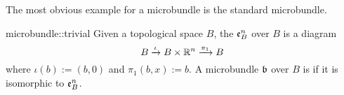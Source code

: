 \begin{myparagraph}
    The most obvious example for a microbundle is the standard microbundle.
\end{myparagraph}

\begin{myexample}{microbundle::trivial}{}
    Given a topological space $B$, the  $\mathfrak{e}^{n}_{B}$ over $B$ is a diagram
    \[ B \xrightarrow{\iota} B \times \mathbb{R}^n \xrightarrow{\pi_1} B{} \]
    where $\iota(b) := (b, 0)$ and $\pi_1(b, x) := b$.
    A microbundle $\mathfrak{b}$ over $B$ is  if it is isomorphic to $\mathfrak{e}^{n}_{B}$.
\end{myexample}